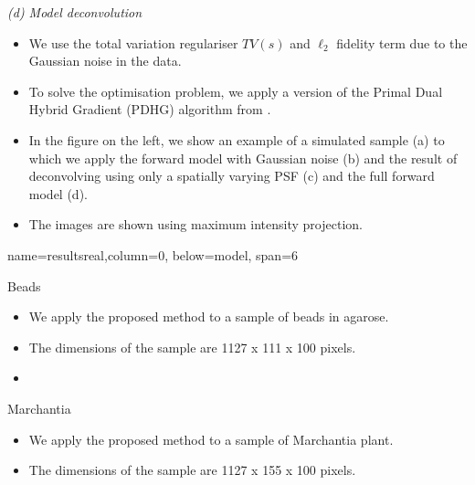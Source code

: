 \documentclass[a0paper,portrait,fontscale=0.35]{baposter}
\newcommand{\mycaption}[1]{
  {
    \smaller
    \emph{#1}
  }
}
\theoremstyle{plain}
\theoremstyle{plain}
\theoremstyle{definition}
\theoremstyle{plain}
\theoremstyle{definition}
\begin{document}
\begin{poster}
{\begin{minipage}[t]{0.55\textwidth}
\begin{minipage}[t]{0.49\textwidth}
        \vspace{0.3em}
        \mycaption{
          (d) Model deconvolution
        }
      \end{minipage}
    \end{minipage}
    \hspace{-0.5em}
    \begin{minipage}[t]{0.45\textwidth}
      \begin{itemize}
        \item We use the total variation regulariser $TV(s)$
          and $\ell_2$ fidelity term due to the Gaussian
          noise in the data. 

        \item To solve the optimisation problem, we apply a version
          of the Primal Dual Hybrid Gradient (PDHG) 
          algorithm from \cite{Boulanger2018,Condat2013}.

        \item In the figure on the left, we show an example of a simulated sample (a) 
          to which we apply the forward model with Gaussian noise (b)
          and the result of deconvolving using only a spatially varying
          PSF (c) and the full forward model (d). 

        \item The images are shown 
          using maximum intensity projection.
      \end{itemize}
    \end{minipage}
}

{name=resultsreal,column=0, below=model, span=6}{
  \begin{minipage}[t]{0.33\textwidth} 

    Beads
    \begin{itemize}
      \item We apply the proposed method to a sample of 
        beads in agarose.
      \item The dimensions of the sample are 1127 x 111 x 100 pixels.

      \item
    \end{itemize}

    Marchantia
    \begin{itemize}
      \item We apply the proposed method to a sample of 
        Marchantia plant.
      \item The dimensions of the sample 
        are 1127 x 155 x 100 pixels.


\end{itemize}
\end{minipage}}
\end{poster}
\end{document}
